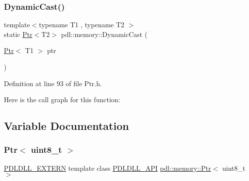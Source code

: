 \subsubsection{\texorpdfstring{DynamicCast()}{DynamicCast()}}
{\footnotesize\ttfamily template$<$typename T1 , typename T2 $>$ \\
static \mbox{\hyperlink{classpdl_1_1memory_1_1_ptr}{Ptr}}$<$T2$>$ pdl\+::memory\+::\+Dynamic\+Cast (\begin{DoxyParamCaption}\item[{\mbox{\hyperlink{classpdl_1_1memory_1_1_ptr}{Ptr}}$<$ T1 $>$}]{ptr }\end{DoxyParamCaption})\hspace{0.3cm}{\ttfamily [static]}}



Definition at line 93 of file Ptr.\+h.


\begin{DoxyCode}{0}

\end{DoxyCode}
Here is the call graph for this function\+:


\subsection{Variable Documentation}
\mbox{\label{namespacepdl_1_1memory_a35350baed30ad18b45ce6cc3c143605a}} 
\subsubsection{\texorpdfstring{Ptr$<$ uint8\_t $>$}{Ptr< uint8\_t >}}
{\footnotesize\ttfamily \mbox{\hyperlink{_p_d_core_8h_a04358319746c08fd83185029d2df5f4a}{P\+D\+L\+D\+L\+L\+\_\+\+E\+X\+T\+E\+RN}} template class \mbox{\hyperlink{_p_d_core_8h_ae8c5186e53170509c65eaabab6c2c705}{P\+D\+L\+D\+L\+L\+\_\+\+A\+PI}} \mbox{\hyperlink{classpdl_1_1memory_1_1_ptr}{pdl\+::memory\+::\+Ptr}}$<$ uint8\+\_\+t $>$}



